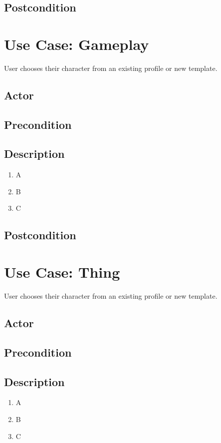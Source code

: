 \documentclass[11pt]{article}
\begin{document}
		\subsection{Postcondition}

    \section{Use Case: Gameplay}
	User chooses their character from an existing profile or new template.

		\subsection{Actor}

		\subsection{Precondition}
 
		\subsection{Description}
			\begin{enumerate}
			\item A
			\item B
			\item C
			\end{enumerate}

		\subsection{Postcondition}

    \section{Use Case: Thing}
	User chooses their character from an existing profile or new template.

		\subsection{Actor}

		\subsection{Precondition}
 
		\subsection{Description}
			\begin{enumerate}
			\item A
			\item B
			\item C
			\end{enumerate}
\end{document}
